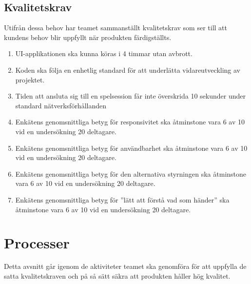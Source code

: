 \documentclass[10pt]{article}
\begin{document}
	\subsection{Kvalitetskrav}
	Utifrån dessa behov har teamet sammanställt kvalitetskrav som ser till att kundens behov blir uppfyllt när produkten färdigställts.
	\begin{enumerate}
		\item UI-applikationen ska kunna köras i 4 timmar utan avbrott.
		\item Koden ska följa en enhetlig standard för att underlätta vidareutveckling av projektet.
		\item Tiden att ansluta sig till en spelsession får inte överskrida 10 sekunder under standard nätverksförhållanden
		\item Enkätens genomsnittliga betyg för responsivitet ska åtminstone vara 6 av 10 vid en undersökning 20 deltagare.
		\item Enkätens genomsnittliga betyg för användbarhet ska åtminstone vara 6 av 10 vid en undersökning 20 deltagare.
		\item Enkätens genomsnittliga betyg för den alternativa styrningen ska åtminstone vara 6 av 10 vid en undersökning 20 deltagare.
		\item Enkätens genomsnittliga betyg för ''lätt att förstå vad som händer'' ska åtminstone vara 6 av 10 vid en undersökning 20 deltagare.
		
	\end{enumerate}

\pagebreak
\section{Processer}
	Detta avsnitt går igenom de aktiviteter teamet ska genomföra för att uppfylla de satta kvalitetskraven och på så sätt säkra att produkten håller hög kvalitet.
\end{document}

